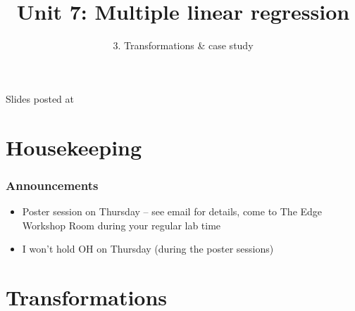 \documentclass[slidestop,compress,mathserif,12pt,t,professionalfonts,xcolor=table]{beamer}
\title{Unit 7: Multiple linear regression}
\subtitle{3. Transformations \& case study}
\author{\CourseName}
\date{}
\institute{\InstituteName}
\begin{document}



\begin{frame}[plain]

\titlepage

\vfill

{\scriptsize {} \hfill Slides posted at  \webURL{\CourseSite}}

\addtocounter{framenumber}{-1} 

\end{frame}


\section{Housekeeping}


\begin{frame}
\frametitle{Announcements}

\begin{itemize}

\item Poster session on Thursday -- see email for details, come to The Edge Workshop Room during
your regular lab time

\item I won't hold OH on Thursday (during the poster sessions)

\end{itemize}

\end{frame}


\section{Transformations}

\end{document}
